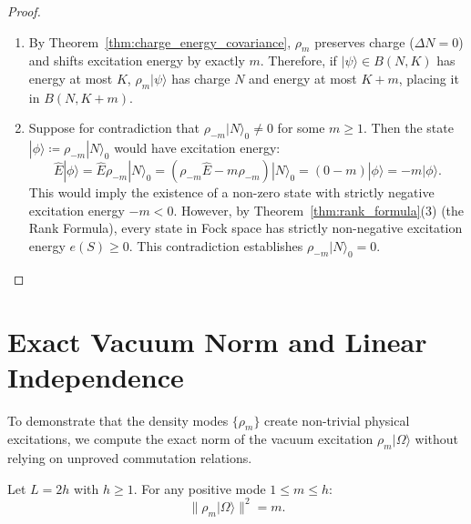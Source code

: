 \begin{proof}
\begin{enumerate}
    \item By Theorem~\ref{thm:charge_energy_covariance}, $\rho_m$ preserves charge ($\Delta N = 0$) and shifts excitation energy by exactly $m$. Therefore, if $|\psi\rangle \in B(N, K)$ has energy at most $K$, $\rho_m |\psi\rangle$ has charge $N$ and energy at most $K + m$, placing it in $B(N, K+m)$.
    \item Suppose for contradiction that $\rho_{-m} |N\rangle_0 \neq 0$ for some $m \ge 1$.
    Then the state $|\phi\rangle \coloneqq \rho_{-m} |N\rangle_0$ would have excitation energy:
    \[
    \hat{E} |\phi\rangle = \hat{E} \rho_{-m} |N\rangle_0 = (\rho_{-m} \hat{E} - m \rho_{-m}) |N\rangle_0 = (0 - m) |\phi\rangle = -m |\phi\rangle.
    \]
    This would imply the existence of a non-zero state with strictly negative excitation energy $-m < 0$. However, by Theorem~\ref{thm:rank_formula}(3) (the Rank Formula), every state in Fock space has strictly non-negative excitation energy $e(S) \ge 0$. This contradiction establishes $\rho_{-m} |N\rangle_0 = 0$.
\end{enumerate}
\end{proof}

\section{Exact Vacuum Norm and Linear Independence}

To demonstrate that the density modes $\{\rho_m\}$ create non-trivial physical excitations, we compute the exact norm of the vacuum excitation $\rho_m |\Omega\rangle$ without relying on unproved commutation relations.

\begin{theorem}
\label{thm:vacuum_norm}
Let $L = 2h$ with $h \ge 1$. For any positive mode $1 \le m \le h$:
\begin{equation}
\| \rho_m |\Omega\rangle \|^2 = m.
\end{equation}
\end{theorem}

